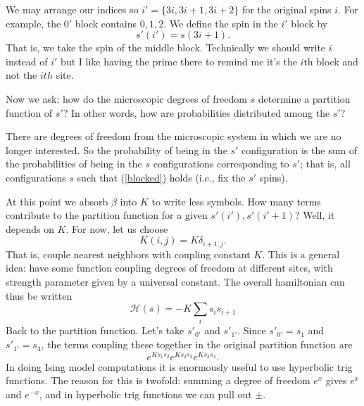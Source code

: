 \documentclass[main.tex]{subfiles}
\begin{document}
We may arrange our indices so $i' = \{3i,3i+1,3i+2\}$ for the original spins $i$. For example, the $0'$ block contains $0,1,2$. We define the spin in the $i'$ block by 
\begin{equation} \label{blocked}
s'(i') = s(3i + 1).
\end{equation}
That is, we take the spin of the middle block. Technically we should write $i$ instead of $i'$ but I like having the prime there to remind me it's the $i$th block and not the $ith$ site. 

Now we ask: how do the microscopic degrees of freedom $s$ determine a partition function of $s'$? In other words, how are probabilities distributed among the $s'$? 

There are degrees of freedom from the microscopic system in which we are no longer interested. So the probability of being in the $s'$ configuration is the sum of the probabilities of being in the $s$ configurations corresponding to $s'$; that is, all configurations $s$ such that (\ref{blocked}) holds (i.e., fix the $s'$ spins).

At this point we absorb $\beta$ into $K$ to write less symbols. How many terms contribute to the partition function for a given $s'(i'),s'(i'+1)$? Well, it depends on $K$. For now, let us choose
\[
K(i,j) = K \delta_{i+1,j}.
\]
That is, couple nearest neighbors with coupling constant $K$. This is a general idea: have some function coupling degrees of freedom at different sites, with strength parameter given by a universal constant. The overall hamiltonian can thus be written
\[
\mathcal{H} (s) = - K \sum_i s_i s_{i+1}
\]
Back to the partition function. Let's take $s'_{0'}$ and $s'_{1'}$. Since $s'_{0'} = s_1$ and $s'_{1'} = s_4$, the terms coupling these together in the original partition function are
\begin{equation} \label{coupling}
e^{K s_1 s_2} e^{K s_2 s_3} e^{K s_3 s_4}.
\end{equation}
In doing Ising model computations it is enormously useful to use hyperbolic trig functions. The reason for this is twofold: summing a degree of freedom $e^x$ gives $e^x$ and $e^{-x}$, and in hyperbolic trig functions we can pull out $\pm$. 
\end{document}
